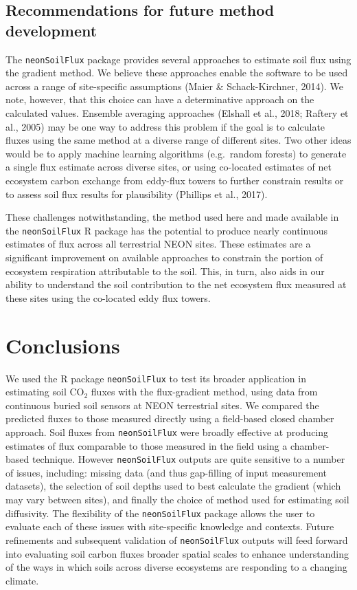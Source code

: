 \documentclass[
  letterpaper,
  DIV=11,
  numbers=noendperiod]{scrartcl}
\begin{document}
\subsection{Recommendations for future method
development}\label{recommendations-for-future-method-development}

The \texttt{neonSoilFlux} package provides several approaches to
estimate soil flux using the gradient method. We believe these
approaches enable the software to be used across a range of
site-specific assumptions (Maier \& Schack-Kirchner, 2014). We note,
however, that this choice can have a determinative approach on the
calculated values. Ensemble averaging approaches (Elshall et al., 2018;
Raftery et al., 2005) may be one way to address this problem if the goal
is to calculate fluxes using the same method at a diverse range of
different sites. Two other ideas would be to apply machine learning
algorithms (e.g.~random forests) to generate a single flux estimate
across diverse sites, or using co-located estimates of net ecosystem
carbon exchange from eddy-flux towers to further constrain results or to
assess soil flux results for plausibility (Phillips et al., 2017).

These challenges notwithstanding, the method used here and made
available in the \texttt{neonSoilFlux} R package has the potential to
produce nearly continuous estimates of flux across all terrestrial NEON
sites. These estimates are a significant improvement on available
approaches to constrain the portion of ecosystem respiration
attributable to the soil. This, in turn, also aids in our ability to
understand the soil contribution to the net ecosystem flux measured at
these sites using the co-located eddy flux towers.

\section{Conclusions}\label{conclusions}

We used the R package \texttt{neonSoilFlux} to test its broader
application in estimating soil CO\(_2\) fluxes with the flux-gradient
method, using data from continuous buried soil sensors at NEON
terrestrial sites. We compared the predicted fluxes to those measured
directly using a field-based closed chamber approach. Soil fluxes from
\texttt{neonSoilFlux} were broadly effective at producing estimates of
flux comparable to those measured in the field using a chamber-based
technique. However \texttt{neonSoilFlux} outputs are quite sensitive to
a number of issues, including: missing data (and thus gap-filling of
input measurement datasets), the selection of soil depths used to best
calculate the gradient (which may vary between sites), and finally the
choice of method used for estimating soil diffusivity. The flexibility
of the \texttt{neonSoilFlux} package allows the user to evaluate each of
these issues with site-specific knowledge and contexts. Future
refinements and subsequent validation of \texttt{neonSoilFlux} outputs
will feed forward into evaluating soil carbon fluxes broader spatial
scales to enhance understanding of the ways in which soils across
diverse ecosystems are responding to a changing climate.
\end{document}
